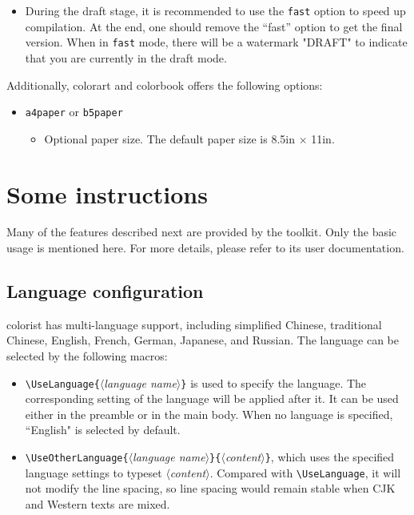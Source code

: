 \documentclass[allowbf]{colorart}
\providecommand{\meta}[1]{$\langle${\normalfont\itshape#1}$\rangle$}
\newenvironment{remind}[1][Remind]{%
    \begin{tcolorbox}[breakable,
        enhanced,
        width = \textwidth,
        colback = white, colbacktitle = paper,
        colframe = gray!50, boxrule=0.2mm,
        coltitle = black,
        fonttitle = \sffamily,
        attach boxed title to top left = {yshift=-\tcboxedtitleheight/2,  xshift=\tcboxedtitlewidth/4},
        boxed title style = {boxrule=0pt, colframe=paper},
        before skip = 0.3cm,
        after skip = 0.3cm,
        top = 3mm,
        bottom = 3mm,
        title={\sffamily #1}]%
}{\end{tcolorbox}}
\providecommand{\colorist}{{\normalfont\textsf{colorist}}}
\providecommand{\colorart}{{\normalfont\textsf{colorart}}}
\providecommand{\colorbook}{{\normalfont\textsf{colorbook}}}
\begin{document}
\begin{remind}
    \begin{itemize}
        \item During the draft stage, it is recommended to use the \verb|fast| option to speed up compilation. At the end, one should remove the ``fast'' option to get the final version. When in \verb|fast| mode, there will be a watermark "DRAFT" to indicate that you are currently in the draft mode.
    \end{itemize}
\end{remind}

\bigskip
Additionally, \colorart{} and \colorbook{} offers the following options: 
\begin{itemize}
    \item \texttt{a4paper} or \texttt{b5paper}
        \begin{itemize}
            \item Optional paper size. The default paper size is 8.5in $\times$ 11in.
        \end{itemize}
\end{itemize}


\section{Some instructions}

Many of the features described next are provided by the \ProjLib{} toolkit. Only the basic usage is mentioned here. For more details, please refer to its user documentation.

\subsection{Language configuration}

\colorist{} has multi-language support, including simplified Chinese, traditional Chinese, English, French, German, Japanese, and Russian. The language can be selected by the following macros:

\begin{itemize}
    \item \lstinline|\UseLanguage{|\meta{language name}\lstinline|}| is used to specify the language. The corresponding setting of the language will be applied after it. It can be used either in the preamble or in the main body. When no language is specified, ``English" is selected by default.
    \item \lstinline|\UseOtherLanguage{|\meta{language name}\lstinline|}{|\meta{content}\lstinline|}|, which uses the specified language settings to typeset \meta{content}. Compared with \lstinline|\UseLanguage|, it will not modify the line spacing, so line spacing would remain stable when CJK and Western texts are mixed.
\end{itemize}
\end{document}
